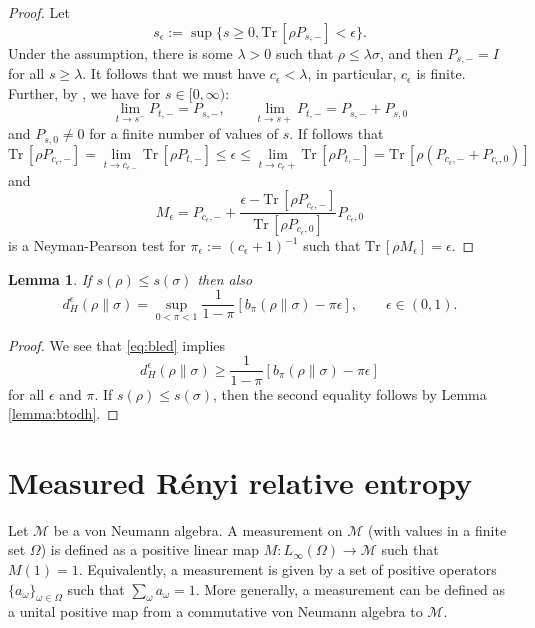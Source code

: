 \documentclass[12pt]{article}
\newtheorem{lemma}{Lemma}
\theoremstyle{definition}
\theoremstyle{remark}
\def\Me{\mathcal M}
\def \Tr{\mathrm{Tr}\,}
\begin{document}
\begin{proof} Let 
\[
s_\epsilon:=\sup\{s\ge0, \Tr[\rho P_{s,-}]< \epsilon\}.
\]
Under the assumption, there is some
$\lambda>0$ such that $\rho\le \lambda \sigma$, and  then $P_{s,-}=I$ for all $s\ge
\lambda$. It follows that we must have $c_\epsilon<\lambda$, in particular, $c_\epsilon$
is finite. Further, by  \cite[Lemma ]{jencova2012reversibility}, we have for $s\in [0,\infty)$:
\[
\lim_{t\to s^-} P_{t,-}=P_{s,-},\qquad \lim_{t\to s+}P_{t,-}=P_{s,-}+P_{s,0}
\]
and $P_{s,0}\ne 0$ for a finite number of values of $s$. If follows that
\[
\Tr[\rho
P_{c_\epsilon,-}]=\lim_{t\to c_{\epsilon-}}\Tr[\rho P_{t,-}]\le \epsilon \le \lim_{t\to c_\epsilon+}\Tr[\rho
P_{t,-}]=\Tr[\rho(P_{c_\epsilon,-}+P_{c_\epsilon,0})]
\]
and 
\[
M_\epsilon=P_{c_\epsilon,-}+\frac{\epsilon- \Tr[\rho P_{c_\epsilon,-}]}{\Tr[\rho
P_{c_\epsilon,0}]}P_{c_\epsilon,0}
\]
is a Neyman-Pearson test for $\pi_\epsilon:=(c_\epsilon+1)^{-1}$ such that $\Tr[\rho
M_\epsilon]=\epsilon$.



\end{proof}


\begin{lemma}\label{lemma:btodh_fd} 
If $s(\rho)\le s(\sigma)$ then also
\[
d_H^\epsilon(\rho\|\sigma)=\sup_{0<\pi<1}\frac{1}{1-\pi}
[b_\pi(\rho\|\sigma)-\pi\epsilon],\qquad \epsilon\in (0,1).
\]


\end{lemma}

\begin{proof}
We see that \eqref{eq:bled}
implies 
\[
d_H^\epsilon(\rho\|\sigma)\ge \frac{1}{1-\pi}[b_\pi(\rho\|\sigma)-\pi\epsilon]
\]
for all $\epsilon$ and $\pi$. If $s(\rho)\le s(\sigma)$, then the second equality follows
by Lemma \ref{lemma:btodh}.


\end{proof}


\section{Measured R\'enyi relative entropy}

Let $\Me$ be a von Neumann algebra. A measurement on $\Me$ (with values in a finite set
$\Omega$) is defined as a positive linear map $M:L_\infty(\Omega)\to \Me$ such that
$M(1)=1$. Equivalently, a measurement is given by a set of positive operators
$\{a_\omega\}_{\omega\in \Omega}$ such that $\sum_\omega a_\omega=1$. More generally, a
measurement can be defined as a unital positive map from a commutative von Neumann algebra
to $\Me$. 
\end{document}
